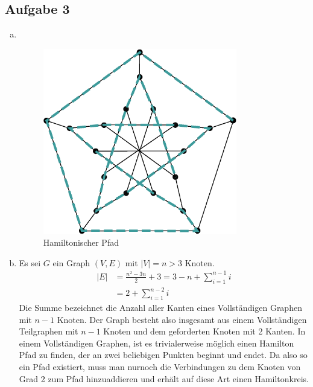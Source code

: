\documentclass[11pt]{article}
\newcommand{\abs}[1]{\left| #1 \right| }
\begin{document}
\subsection*{Aufgabe 3}
\begin{enumerate}[a)]
  \item  $ $
    \begin{figure}[h!]
      \centering
      \includegraphics[width=0.8\textwidth]{hamilton_graph}
      \caption{Hamiltonischer Pfad}
      \label{fig:hamilton_graph.eps}
    \end{figure}
  \item
    Es sei $G$ ein Graph $(V, E)$ mit $\abs{V} = n>3$ Knoten.
    \begin{align*}
      |E| & =\frac{n^2 - 3n}{2} + 3 = 3 - n + \sum_{i=1}^{n-1} i \\
          & = 2  + \sum_{i=1}^{n-2} i
    \end{align*}
    Die Summe bezeichnet die Anzahl aller Kanten eines Vollst\"andigen 
    Graphen mit $n-1$ Knoten. Der Graph besteht also insgesamt aus einem 
    Vollst\"andigen Teilgraphen mit $n-1$ Knoten und dem geforderten Knoten
    mit 2 Kanten. In einem Vollst\"andigen Graphen, ist es trivialerweise
    m\"oglich einen Hamilton Pfad zu finden, der an zwei beliebigen 
    Punkten beginnt und endet. Da also so ein Pfad existiert, muss man
    nurnoch die Verbindungen zu dem Knoten von Grad 2 zum Pfad hinzuaddieren
    und erh\"alt auf diese Art einen Hamiltonkreis.

\end{enumerate} 
\end{document}
